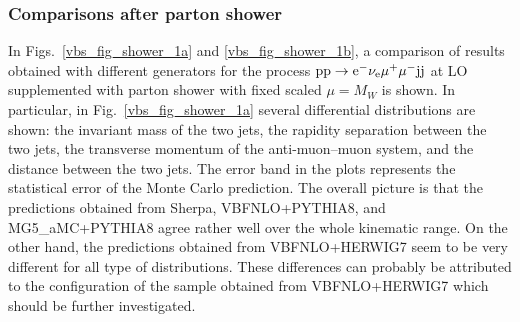 \documentclass[11pt]{cernrep}
\begin{document}
\subsubsection*{Comparisons after parton shower}

In Figs.~\ref{vbs_fig_shower_1a} and \ref{vbs_fig_shower_1b}, a comparison of results obtained with different
generators for the process ${\rm p} {\rm p} \to {\rm e}^-  \nu_{\rm e}  \mu^+ \mu^- {\rm j} {\rm j}$ at LO supplemented with parton shower with fixed scaled $\mu =M_W$ is shown. 
In particular, in Fig.~\ref{vbs_fig_shower_1a} several differential distributions are shown:
the invariant mass of the two jets, the rapidity separation between
the two jets, the transverse momentum of the anti-muon--muon system,
and the distance between the two jets. The error band in the plots represents the statistical error of the Monte Carlo
prediction.  
The overall picture is that the predictions obtained from {\sc Sherpa}, {\sc VBFNLO}+{\sc PYTHIA8}, and {\sc MG5\_aMC}+{\sc PYTHIA8} agree rather well over the whole kinematic range.
On the other hand, the predictions obtained from {\sc VBFNLO}+{\sc HERWIG7} seem to be very different for all type of distributions.
These differences can probably be attributed to the configuration of the sample obtained from {\sc VBFNLO}+{\sc HERWIG7} which should be further investigated.
\end{document}
